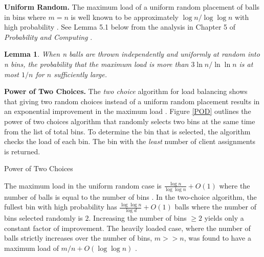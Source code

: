\textbf{Uniform Random.} The maximum load of a uniform random placement of balls in bins where $m=n$ is well known to be approximately $\log n / \log \log n$ with high probability \cite{gonnet1981expected}.
See Lemma 5.1 below from the analysis in Chapter 5 of \textit{Probability and Computing} \cite{mitzenmacher2005probability}. 

\newtheorem{lemma}[theorem]{Lemma}

\begin{lemma} When n balls are thrown independently and uniformly at random into n bins, the probability that the maximum load is more than $3 \ln n / \ln \ln n$ is at most $1/n$ for $n$ sufficiently large.
\end{lemma}
\textbf{Power of Two Choices.} The \emph{two choice} algorithm for load balancing shows that giving two random choices instead of a uniform random placement results in an exponential improvement in the maximum load \cite{mitzenmacher1996power}. Figure \ref{POD} outlines the power of two choices algorithm that randomly selects two bins at the same time from the list of total bins. To determine the bin that is selected, the algorithm checks the load of each bin. The bin with the \emph{least} number of client assignments is returned. 

\begin{algorithm}[t]
\DontPrintSemicolon
{}
\caption{Power of Two Choices \label{POD}}
\end{algorithm}

The maximum load in the uniform random case is $\frac{\log n}{\log \log n} + O(1)$ where the number of balls is equal to the number of bins \cite{azar1999balanced}. In the two-choice algorithm, the fullest bin with high probability has $ \frac{\log \log n}{\log d} + O(1)$ balls where the number of bins selected randomly is $2$. Increasing the number of bins $\geq 2$ yields only a constant factor of improvement. The heavily loaded case, where the number of balls strictly increases over the number of bins, $m >> n$, was found to have a maximum load of $m/n + O(\log{\log{n}})$ \cite{berenbrink2000balanced}. \\

